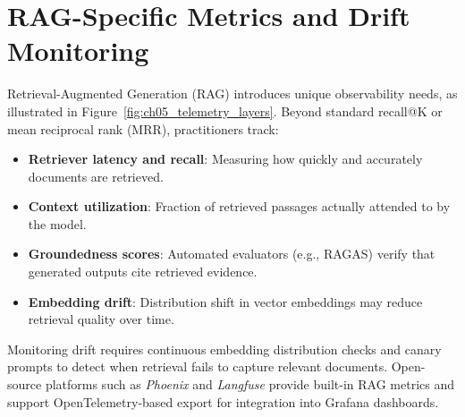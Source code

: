 \section{RAG-Specific Metrics and Drift Monitoring}
\label{sec:rag-specific-metrics-and-drift-monitoring}
Retrieval-Augmented Generation (RAG) introduces unique observability needs, as illustrated in Figure~\ref{fig:ch05_telemetry_layers}. Beyond standard recall@K or mean reciprocal rank (MRR), practitioners track:
\begin{itemize}
    \item \textbf{Retriever latency and recall}: Measuring how quickly and accurately documents are retrieved.
    \item \textbf{Context utilization}: Fraction of retrieved passages actually attended to by the model.
    \item \textbf{Groundedness scores}: Automated evaluators (e.g., RAGAS) verify that generated outputs cite retrieved evidence.
    \item \textbf{Embedding drift}: Distribution shift in vector embeddings may reduce retrieval quality over time.
\end{itemize}

Monitoring drift requires continuous embedding distribution checks and canary prompts to detect when retrieval fails to capture relevant documents. Open-source platforms such as \emph{Phoenix} \cite{arize_phoenix_docs} and \emph{Langfuse} \cite{langfuse_obs_overview} provide built-in RAG metrics and support OpenTelemetry-based export for integration into Grafana \cite{grafana_dashboards} dashboards.

